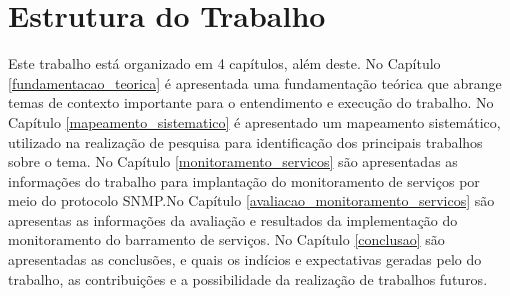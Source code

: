 
\section{Estrutura do Trabalho}

Este trabalho está organizado em 4 capítulos, além deste. No Capítulo \ref{fundamentacao_teorica} é apresentada uma fundamentação teórica que abrange temas de contexto importante para o entendimento e execução do trabalho. No Capítulo \ref{mapeamento_sistematico} é apresentado um mapeamento sistemático, utilizado na realização de pesquisa para identificação dos principais trabalhos sobre o tema. No Capítulo \ref{monitoramento_servicos} são apresentadas as informações do trabalho para implantação do monitoramento de serviços por meio do protocolo \acrshort{SNMP}.No Capítulo \ref{avaliacao_monitoramento_servicos} são apresentas as informações da avaliação e resultados da implementação do monitoramento do barramento de serviços. No Capítulo \ref{conclusao} são apresentadas as conclusões, e quais os indícios e expectativas geradas pelo do trabalho, as contribuições e a possibilidade da realização de trabalhos futuros.